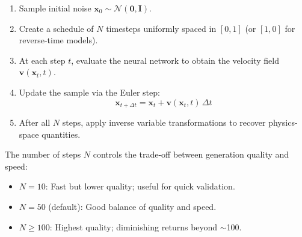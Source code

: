 \documentclass[11pt,a4paper]{article}
\begin{document}
\begin{enumerate}
  \item Sample initial noise $\mathbf{x}_0 \sim \mathcal{N}(\mathbf{0}, \mathbf{I})$.
  \item Create a schedule of $N$ timesteps uniformly spaced in $[0, 1]$
    (or $[1, 0]$ for reverse-time models).
  \item At each step $t$, evaluate the neural network to obtain the velocity field
    $\mathbf{v}(\mathbf{x}_t, t)$.
  \item Update the sample via the Euler step:
    \begin{equation}
      \mathbf{x}_{t+\Delta t} = \mathbf{x}_t + \mathbf{v}(\mathbf{x}_t, t)\,\Delta t
    \end{equation}
  \item After all $N$ steps, apply inverse variable transformations to recover
    physics-space quantities.
\end{enumerate}

\noindent
The number of steps $N$ controls the trade-off between generation quality and speed:

\begin{itemize}
  \item $N = 10$: Fast but lower quality; useful for quick validation.
  \item $N = 50$ (default): Good balance of quality and speed.
  \item $N \geq 100$: Highest quality; diminishing returns beyond $\sim$100.
\end{itemize}

\end{document}
